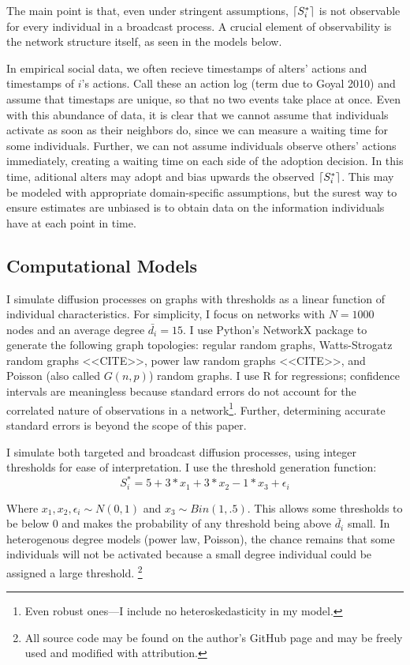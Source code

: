 \documentclass{article}
\DeclarePairedDelimiter{\ceil}{\lceil}{\rceil}
\begin{document}
The main point is that, even under stringent assumptions, $\ceil{S_i^*}$ is not observable for every individual in a broadcast process. A crucial element of observability is the network structure itself, as seen in the models below.

In empirical social data, we often recieve timestamps of alters' actions and timestamps of $i$'s actions. Call these an action log (term due to Goyal 2010) and assume that timestaps are unique, so that no two events take place at once. Even with this abundance of data, it is clear that we cannot assume that individuals activate as soon as their neighbors do, since we can measure a waiting time for some individuals. Further, we can not assume individuals observe others' actions immediately, creating a waiting time on each side of the adoption decision. In this time, aditional alters may adopt and bias upwards the observed $\ceil{S_i^*}$. This may be modeled with appropriate domain-specific assumptions, but the surest way to ensure estimates are unbiased is to obtain data on the information individuals have at each point in time.

\subsection{Computational Models}

I simulate diffusion processes on graphs with thresholds as a linear function of individual characteristics. For simplicity, I focus on networks with $N = 1000$ nodes and an average degree $\bar{d_i} = 15$. I use Python's NetworkX package to generate the following graph topologies: regular random graphs, Watts-Strogatz random graphs <<CITE>>, power law random graphs <<CITE>>, and Poisson (also called $G(n,p)$) random graphs. I use R for regressions; confidence intervals are meaningless because standard errors do not account for the correlated nature of observations in a network\footnote{Even robust ones---I include no heteroskedasticity in my model.}. Further, determining accurate standard errors is beyond the scope of this paper.

I simulate both targeted and broadcast diffusion processes, using integer thresholds for ease of interpretation. I use the threshold generation function: 
\[
S_i^* = 5 + 3*x_1 + 3*x_2 - 1*x_3 + \epsilon_i
\]

Where $x_1, x_2, \epsilon_i \sim N(0,1)$ and $x_3 \sim Bin(1,.5)$. This allows some thresholds to be below 0 and makes the probability of any threshold being above $\bar{d_i}$ small. In heterogenous degree models (power law, Poisson), the chance remains that some individuals will not be activated because a small degree individual could be assigned a large threshold. \footnote{All source code may be found on the author's GitHub page and may be freely used and modified with attribution.}
\end{document}

